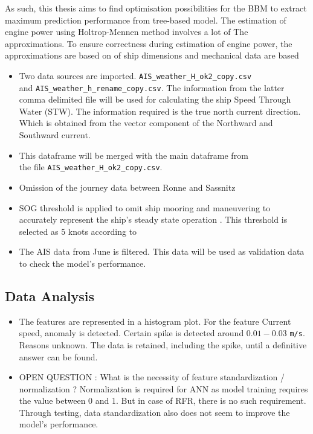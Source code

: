As such, this thesis aims to find optimisation possibilities for the BBM to extract maximum prediction performance from tree-based model. The estimation of engine power using Holtrop-Mennen method involves a lot of The approximations. To ensure correctness during estimation of engine power, the approximations are based on   of ship dimensions and mechanical data are based  

\begin{itemize}
    \item Two data sources are imported. {\tt AIS\_weather\_H\_ok2\_copy.csv} \\ and {\tt AIS\_weather\_h\_rename\_copy.csv}. The information from the latter comma delimited 
    file will be used for calculating the ship Speed Through Water (STW).  
    The information required is the true north current direction. Which is obtained from the vector component of the Northward and Southward current.
    \item This dataframe will be merged with the main dataframe from \\ the file {\tt AIS\_weather\_H\_ok2\_copy.csv}.
    \item Omission of the journey data between Ronne and Sassnitz
    \item SOG threshold is applied to omit ship mooring and maneuvering to accurately represent the ship's steady state operation 
    \cite{Abebe.2020,BalBesikci.2016,Gkerekos.2019,Yang.2020}. This threshold is selected as 5 knots according to \cite{Abebe.2020}
    \item The AIS data from June is filtered. This data will be used as validation data to check the model's performance.
\end{itemize}
 
\subsection{Data Analysis}
\begin{itemize}
    \item The features are represented in a histogram plot. For the feature Current speed, anomaly is detected. Certain spike is detected around $0.01 - 0.03$ \verb|m/s|. Reasons unknown. The data is retained, including the spike, until a definitive answer can be found.
    \item OPEN QUESTION : What is the necessity of feature standardization / normalization ? Normalization is required for ANN as model training requires the value between 0 and 1. But in case of RFR, there is no such requirement. Through testing, data standardization also does not seem to improve the model's performance. 
\end{itemize}




